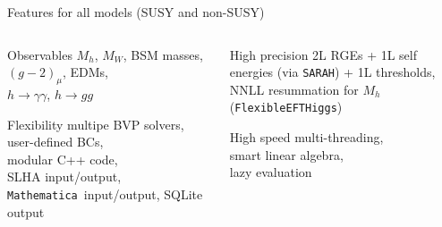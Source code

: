 \documentclass[hyperref={pdfpagelabels=false},ngerman]{beamer}
\newcommand{\SARAH}{\texttt{SARAH}}
\newcommand{\Mathematica}{\texttt{Mathematica}}
\begin{document}
\begin{frame}{Features for all models (SUSY and non-SUSY)}
  \begin{columns}[T]
    \begin{column}{0.49\textwidth}
      \begin{obsblock}{Observables}
        $M_h$, $M_W$, BSM masses, $(g-2)_\mu$, EDMs,\\
        $h\rightarrow\gamma\gamma$, $h\rightarrow gg$
      \end{obsblock}
      \begin{flexblock}{Flexibility}
        multipe BVP solvers, user-defined BCs,\\ modular C++ code, \\
        SLHA input/output, \Mathematica\ input/output, SQLite output
      \end{flexblock}
    \end{column}
    \begin{column}{0.49\textwidth}
      \begin{precblock}{High precision}
        2L RGEs + 1L self energies (via \SARAH) + 1L thresholds,\\
        NNLL resummation for $M_h$ (\texttt{FlexibleEFTHiggs})
      \end{precblock}
      \begin{speedblock}{High speed}
        multi-threading,\\ smart linear algebra,\\ lazy evaluation
      \end{speedblock}
    \end{column}
  \end{columns}
\end{frame}

\newenvironment{modelblock}[1]{%
  \setbeamercolor{block body}{bg=darkyellow!15}
  \setbeamercolor{block title}{fg=black,bg=darkyellow}
  \begin{block}{#1}}{\end{block}}
\end{document}
